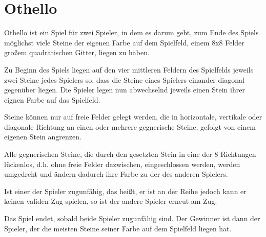 \section{Othello}

Othello ist ein Spiel für zwei Spieler, in dem es darum geht, zum Ende des Spiels möglichst viele Steine der eigenen Farbe auf dem Spielfeld, einem 8x8 Felder großem quadratischen Gitter, liegen zu haben.

Zu Beginn des Spiels liegen auf den vier mittleren Feldern des Spielfelds jeweils zwei Steine jedes Spielers so, dass die Steine eines Spielers einander diagonal gegenüber liegen.
Die Spieler legen nun abwechselnd jeweils einen Stein ihrer eignen Farbe auf das Spielfeld.

Steine können nur auf freie Felder gelegt werden, die in horizontale, vertikale oder diagonale Richtung an einen oder mehrere gegnerische Steine, gefolgt von einem eigenen Stein angrenzen.

Alle gegnerischen Steine, die durch den gesetzten Stein in eine der 8 Richtungen lückenlos, d.h. ohne freie Felder dazwischen, eingeschlossen werden, werden umgedreht und ändern dadurch ihre Farbe zu der des anderen Spielers.

Ist einer der Spieler zugunfähig, das heißt, er ist an der Reihe jedoch kann er keinen validen Zug spielen, so ist der andere Spieler erneut am Zug.

Das Spiel endet, sobald beide Spieler zugunfähig sind. Der Gewinner ist dann der Spieler, der die meisten Steine seiner Farbe auf dem Spielfeld liegen hat.
\cite{worldothellorules}
